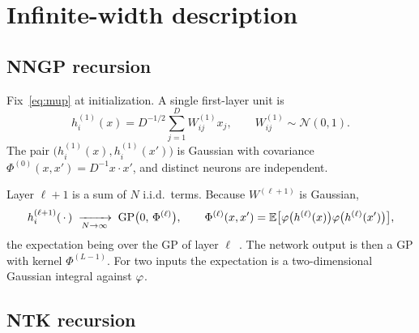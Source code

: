 \section{Infinite-width description}
\label{sec:inf}

\subsection{NNGP recursion}

Fix~\eqref{eq:mup} at initialization. A single first-layer unit is
\begin{equation}
  h^{(1)}_{i}(x)
  =D^{-1/2}\sum_{j=1}^{D} W^{(1)}_{ij}x_j,
  \qquad
  W^{(1)}_{ij}\sim\mathcal{N}(0,1).
  \label{eq:h1}
\end{equation}
The pair $\bigl(h^{(1)}_i(x),h^{(1)}_i(x')\bigr)$ is Gaussian with covariance $\Phi^{(0)}(x,x')=D^{-1}x\cdot x'$, and distinct neurons are independent.

Layer $\ell+1$ is a sum of $N$ i.i.d.\ terms. Because $W^{(\ell+1)}$ is Gaussian,
\begin{equation}
  h^{(\ell+1)}_{i}(\,\cdot\,)
  \;\xrightarrow[N\to\infty]{}\;
  \mathrm{GP}\bigl(0,\,\Phi^{(\ell)}\bigr),
  \qquad
  \Phi^{(\ell)}(x,x')
  =\mathbb{E}\bigl[\varphi\bigl(h^{(\ell)}(x)\bigr)\varphi\bigl(h^{(\ell)}(x')\bigr)\bigr],
  \label{eq:nngp-rec}
\end{equation}
the expectation being over the GP of layer $\ell$~\cite{pehlevan2023infinite}. The network output is then a GP with kernel $\Phi^{(L-1)}$. For two inputs the expectation is a two-dimensional Gaussian integral against $\varphi$.

\subsection{NTK recursion}

